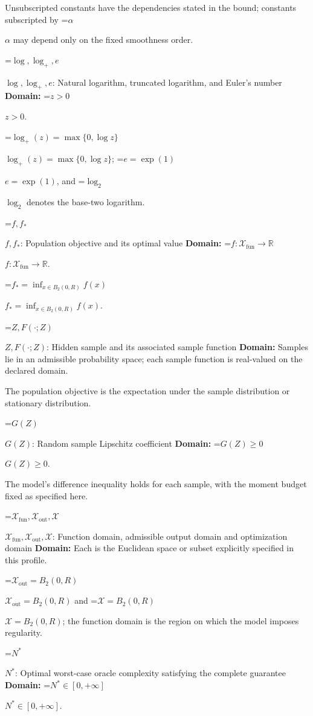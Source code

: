 \documentclass[10pt,a4paper]{article}
\newcommand{\AtlasMath}[1]{\par\begingroup\centering\setbox0=\hbox{$\displaystyle #1$}\ifdim\wd0>1.4\linewidth\typeout{ATLAS WIDE FORMULA: \the\wd0}\fi\ifdim\wd0>\linewidth\resizebox{\linewidth}{!}{\box0}\else\box0\fi\par\endgroup}
\newcommand{\AtlasInlineMath}[1]{\begingroup\setbox0=\hbox{$#1$}\ifdim\wd0>.4\linewidth\endgroup\AtlasMath{#1}\else\endgroup$#1$\fi}
\begin{document}
Unsubscripted constants have the dependencies stated in the bound; constants subscripted by \AtlasInlineMath{\alpha} may depend only on the fixed smoothness order.



\AtlasInlineMath{\log,\log_+,e}: Natural logarithm, truncated logarithm, and Euler's number \textbf{Domain:} \AtlasInlineMath{z>0}.



\AtlasInlineMath{\log_+(z)=\max\{0,\log z\}}; \AtlasInlineMath{e=\exp(1)}, and \AtlasInlineMath{\log_2} denotes the base-two logarithm.



\AtlasInlineMath{f,f_*}: Population objective and its optimal value \textbf{Domain:} \AtlasInlineMath{f:\mathcal{X}_{\mathrm{fun}}\to\mathbb{R}}.



\AtlasInlineMath{f_*=\inf_{x\in B_2(0,R)}f(x)}.



\AtlasInlineMath{Z,F(\cdot;Z)}: Hidden sample and its associated sample function \textbf{Domain:} Samples lie in an admissible probability space; each sample function is real-valued on the declared domain.



The population objective is the expectation under the sample distribution or stationary distribution.



\AtlasInlineMath{G(Z)}: Random sample Lipschitz coefficient \textbf{Domain:} \AtlasInlineMath{G(Z)\ge0}.



The model's difference inequality holds for each sample, with the moment budget fixed as specified here.



\AtlasInlineMath{\mathcal{X}_{\mathrm{fun}},\mathcal{X}_{\mathrm{out}},\mathcal{X}}: Function domain, admissible output domain and optimization domain \textbf{Domain:} Each is the Euclidean space or subset explicitly specified in this profile.



\AtlasInlineMath{\mathcal{X}_{\mathrm{out}}=B_2(0,R)} and \AtlasInlineMath{\mathcal{X}=B_2(0,R)}; the function domain is the region on which the model imposes regularity.



\AtlasInlineMath{N^*}: Optimal worst-case oracle complexity satisfying the complete guarantee \textbf{Domain:} \AtlasInlineMath{N^*\in[0,+\infty]}.
\end{document}

